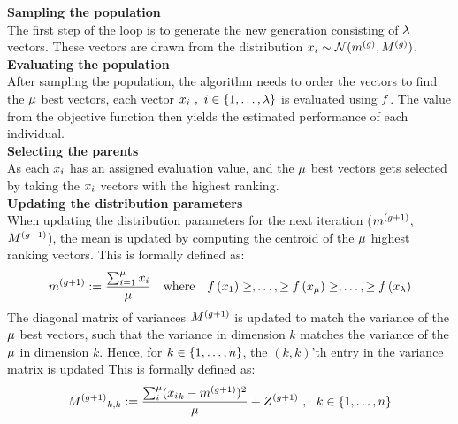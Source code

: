 \textbf{Sampling the population}\\
The first step of the loop is to generate the new generation 
consisting of $\lambda$ vectors. 
These vectors are drawn from the distribution 
$x_{i}\sim \mathcal{N}(m^{(g)},M^{(g)})$.
\\

\textbf{Evaluating the population}\\
After sampling the population, the algorithm needs to order the vectors to find the $\mu$ best vectors, each vector $x_{i}\ ,\ i \in \{1, \dots, \lambda\}$ is evaluated using $f$. 
The value from the objective function then yields 
the estimated performance of each individual.
\\

\textbf{Selecting the parents}\\
As each $x_{i}$ has an assigned evaluation value, and the 
$\mu$ best vectors gets selected by 
taking the $x_{i}$ vectors with the highest ranking.
\\

\textbf{Updating the distribution parameters}\\
When updating the distribution parameters for the next iteration
($m^{(g + 1)}$,$M^{(g + 1)}$), 
the mean is updated by computing the centroid of the 
$\mu$ highest ranking vectors. This is formally defined as:
\begin{align}
\mean^{(\generation +1)}:=\frac{\sum_{i=1}^{\offspringNumber} \individual_{i}}{\offspringNumber}
\ \ \ 
\text{where}
\ \ \ 
\fitnessFunction \left( \individual_{1} \right) \geq, \dots, 
\geq \fitnessFunction \left( \individual_{\offspringNumber} \right) \geq, 
\dots, \geq \fitnessFunction \left( \individual_{\populationSize} \right)
\end{align}
The diagonal matrix of variances $M^{(g + 1)}$ is updated 
to match the variance of the $\mu$ best
vectors, such that the variance in dimension $k$ 
matches the variance of the $\mu$
in dimension $k$. Hence, for $k \in \{ 1,\dots,n \}$,
the $(k,k)$'th entry in the variance matrix is 
updated 
This is formally defined as:
\begin{align}
{M^{(g+1)}}_{k,k}:=\frac{\sum_{i}^{\mu}
({x_{i}}_k - m^{(g +1)})^2}{\mu} + 
Z^{(g + 1)}\ ,\ \ k \in \{ 1,\dots,n \}
\end{align}